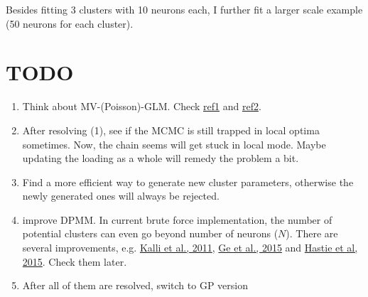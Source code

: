 \documentclass[]{article}
\begin{document}
Besides fitting 3 clusters with 10 neurons each, I further fit a larger scale example (50 neurons for each cluster). 


\clearpage


\section{TODO}
\begin{enumerate}
	\def\labelenumi{(\arabic{enumi})}
	\item
	Think about MV-(Poisson)-GLM. Check \href{https://www.tandfonline.com/doi/full/10.1080/03610926.2012.743565?journalCode=lsta20}{ref1} and \href{https://www.tandfonline.com/doi/full/10.1080/02664763.2021.1877637?src=recsys}{ref2}.
	\item
	After resolving (1), see if the MCMC is still trapped in local optima sometimes. Now, the chain seems will get stuck in local mode. Maybe updating the loading as a whole will remedy the problem a bit.
	\item
	Find a more efficient way to generate new cluster parameters, otherwise the newly generated ones will always be rejected.
	\item
	improve DPMM. In current brute force implementation, the number of potential clusters can even go beyond number of neurons (\(N\)). There are several improvements, e.g. \href{https://link.springer.com/article/10.1007/s11222-009-9150-y}{Kalli et al., 2011}, \href{http://proceedings.mlr.press/v37/gea15.html}{Ge et al., 2015} and \href{https://link.springer.com/article/10.1007/s11222-014-9471-3}{Hastie et al, 2015}. Check them later.
	\item
	After all of them are resolved, switch to GP version
	
\end{enumerate}
\end{document}

